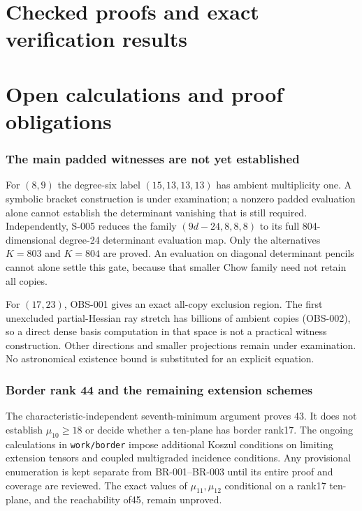 \documentclass[11pt]{article}
\begin{document}
\part{Checked proofs and exact verification results}





\part{Open calculations and proof obligations}
\section{The main padded witnesses are not yet established}
For $(8,9)$ the degree-six label $(15,13,13,13)$ has ambient
multiplicity one. A symbolic bracket construction is under examination;
a nonzero padded evaluation alone cannot establish the determinant
vanishing that is still required. Independently, S-005 reduces the
family $(9d-24,8,8,8)$ to its full 804-dimensional degree-24 determinant
evaluation map. Only the alternatives $K=803$ and $K=804$ are proved.
An evaluation on diagonal determinant pencils cannot alone settle this
gate, because that smaller Chow family need not retain all copies.

For $(17,23)$, OBS-001 gives an exact all-copy exclusion region.
The first unexcluded partial-Hessian ray stretch has billions of
ambient copies (OBS-002), so a direct dense basis computation in that
space is not a practical witness construction. Other directions and
smaller projections remain under examination. No astronomical
existence bound is substituted for an explicit equation.

\section{Border rank 44 and the remaining extension schemes}
The characteristic-independent seventh-minimum argument proves 43.
It does not establish $\mu_{10}\ge18$ or decide whether a ten-plane has
border rank17. The ongoing calculations in \texttt{work/border} impose
additional Koszul conditions on limiting extension tensors and coupled
multigraded incidence conditions. Any provisional enumeration is kept
separate from BR-001--BR-003 until its entire proof and coverage are
reviewed. The exact values of $\mu_{11},\mu_{12}$ conditional on a
rank17 ten-plane, and the reachability of45, remain unproved.
\end{document}
